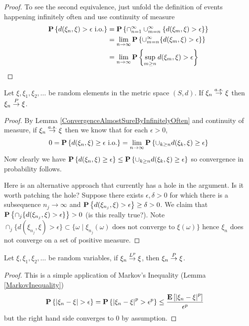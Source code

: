 \begin{proof}
To see the second equivalence, just unfold the definition of events
happening infinitely often and use continuity of measure
\begin{align*}
\textbf{P}\left \{d(\xi_n, \xi) >
  \epsilon \text{ i.o.} \right \} &= \textbf{P}\left \{\cap_{n=1}^\infty
  \cup_{m=n}^\infty \lbrace d(\xi_m, \xi) >
  \epsilon\rbrace  \right \} \\
&= \lim_{n \to \infty} \textbf{P}\left \{\cup_{m=n}^\infty \lbrace d(\xi_m, \xi) >
  \epsilon \rbrace  \right \} \\
&= \lim_{n \to \infty} \textbf{P}\left \{\sup_{m \geq n} d(\xi_m, \xi) >
  \epsilon \right \} \\
\end{align*}
\end{proof}

\begin{lem}\label{ConvergenceAlmostSureImpliesInProbability}Let $\xi, \xi_1, \xi_2, \dots$ be random elements in the
  metric space $(S,d)$.  If $\xi_n \overset{a.s.}\to \xi$ then $\xi_n \overset{P}\to \xi$.
\end{lem}
\begin{proof}
By Lemma \ref{ConvergenceAlmostSureByInfinitelyOften} and continuity of measure, if $\xi_n \overset{a.s.}\to \xi$ then we know that for each
$\epsilon > 0$, 
\begin{align*} 
0=\textbf{P}\left \{d(\xi_n, \xi) \geq
  \epsilon \text{ i.o.} \right \}=\lim_{n \to \infty} \textbf{P}\left \{\cup_{k\geq
    n} {d(\xi_k, \xi) \geq
  \epsilon} \right \}
\end{align*}
Now clearly we have $\textbf{P}\left \{d(\xi_n, \xi) \geq
  \epsilon \right \} \leq \textbf{P}\left \{\cup_{k \geq n} d(\xi_k, \xi) \geq
  \epsilon \right \}$ so convergence in probability follows.

Here is an alternative approach that currently has a hole in the
argument.  Is it worth patching the hole?  Suppose there exists $\epsilon , \delta >
0$ for which there is a subsequence $n_j \to \infty$ and
$\textbf{P}\left \{d(\xi_{n_j}, \xi) > \epsilon \right \} \geq \delta > 0$.  We
claim that $\textbf{P}\left \{\cap_j \lbrace d(\xi_{n_j}, \xi) > \epsilon
  \rbrace  \right \} > 0$ (is this really true?).  Note $\cap_j \lbrace d(\xi_{n_j}, \xi) > \epsilon \rbrace  \subset \{ \omega \mid \xi_{n_j}(\omega) \text{ does not converge
  to }  \xi(\omega) \}$ hence $\xi_n$ does not converge on a set of
positive measure.
\end{proof}

\begin{lem}\label{ConvergenceInMeanImpliesInProbability}Let $\xi,
  \xi_1, \xi_2, \dots$ be random variables, if $\xi_n \overset{L^p}\to \xi$, then $\xi_n \overset{P}\to \xi$.
\end{lem}
\begin{proof}
This is a simple application of Markov's Inequality (Lemma \ref{MarkovInequality})
\begin{align*}
\textbf{P}\left \{\left \vert \xi_n - \xi \right \vert > \epsilon \right \} &= \textbf{P}\left \{\left \vert \xi_n
    - \xi \right \vert^p > \epsilon^p \right \} \leq \frac{\textbf{E}\left[\left \vert \xi_n
    - \xi \right \vert^p\right]}{\epsilon^p}
\end{align*}
but the right hand side converges to $0$ by assumption.
\end{proof}

